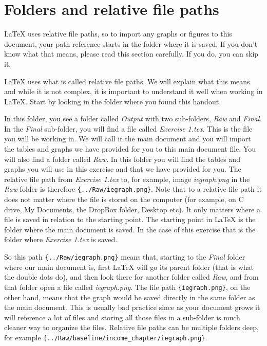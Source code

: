 \documentclass[12pts]{article}
\begin{document}
	\section{Folders and relative file paths}
	
	\begin{tcolorbox}[colback=white,colframe=orange,title=\textbf{Read first}]
			{\LaTeX} uses relative file paths, so to import any graphs or figures to this document, your path reference starts in the folder where it is saved. If you don't know what that means, please read this section carefully. If you do, you can skip it.
	\end{tcolorbox}
	
	{\LaTeX} uses what is called relative file paths. We will explain what this means and while it is not complex, it is important to understand it well when working in {\LaTeX}. Start by looking in the folder where you found this handout. 
	
	In this folder, you see a folder called \emph{Output} with two sub-folders, \emph{Raw} and \emph{Final}. In the \emph{Final} sub-folder, you will find a file called \emph{Exercise 1.tex}. This is the file you will be working in. We will call it the main document and you will import the tables and graphs we have provided for you to this main document file. You will also find a folder called \emph{Raw}. In this folder you will find the tables and graphs you will use in this exercise and that we have provided for you. The relative file path from \emph{Exercise 1.tex} to, for example, image \emph{iegraph.png} in the \emph{Raw} folder is therefore \verb|{../Raw/iegraph.png}|. Note that to a relative file path it does not matter where the file is stored on the computer (for example, on C drive, My Documents, the DropBox folder, Desktop etc). It only matters where a file is saved in relation to the starting point. The starting point in {\LaTeX} is the folder where the main document is saved. In the case of this exercise that is the folder where \emph{Exercise 1.tex} is saved.
	
	So this path \verb|{../Raw/iegraph.png}| means that, starting to the \emph{Final} folder where our main document is, first {\LaTeX} will go its parent folder (that is what the double dots do), and then look there for another folder called \emph{Raw}, and from that folder open a file called \emph{iegraph.png}. The file path \verb|{iegraph.png}|, on the other hand, means that the graph would be saved directly in the same folder as the main document. This is usually bad practice since as your document grows it will reference a lot of files and storing all those files in a sub-folder is much cleaner way to organize the files. Relative file paths can be multiple folders deep, for example \verb|{../Raw/baseline/income_chapter/iegraph.png}|. 
	
\end{document}
